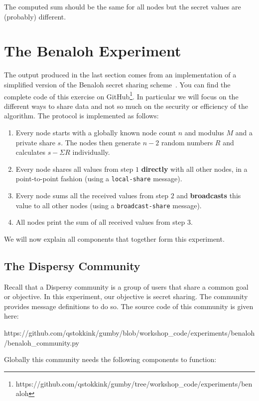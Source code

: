 \documentclass{article}
\begin{document}
The computed sum should be the same for all nodes but the secret values are (probably) different.

\section{The Benaloh Experiment}
The output produced in the last section comes from an implementation of a simplified version of the Benaloh secret sharing scheme~\cite{benaloh1990generalized}.
You can find the complete code of this exercise on GitHub\footnote{https://github.com/qstokkink/gumby/tree/workshop\_code/experiments/benaloh}.
In particular we will focus on the different ways to share data and not so much on the security or efficiency of the algorithm.
The protocol is implemented as follows:

\begin{enumerate}
\item Every node starts with a globally known node count $n$ and modulus $M$ and a private share $s$.
The nodes then generate $n-2$ random numbers $R$ and calculates $s - \Sigma R$ individually.
\item Every node shares all values from step $1$ \textbf{directly} with all other nodes, in a point-to-point fashion (using a \texttt{local-share} message).
\item Every node sums all the received values from step $2$ and \textbf{broadcasts} this value to all other nodes (using a \texttt{broadcast-share} message).
\item All nodes print the sum of all received values from step $3$.
\end{enumerate}

\noindent We will now explain all components that together form this experiment.

\subsection{The Dispersy Community}
\label{sec:dispersy_community}
Recall that a Dispersy community is a group of users that share a common goal or objective. In this experiment, our objective is secret sharing. The community provides message definitions to do so.
The source code of this community is given here:

https://github.com/qstokkink/gumby/blob/workshop\_code/experiments/benaloh/benaloh\_community.py

\vspace{\baselineskip}
\noindent Globally this community needs the following components to function:
\end{document}
